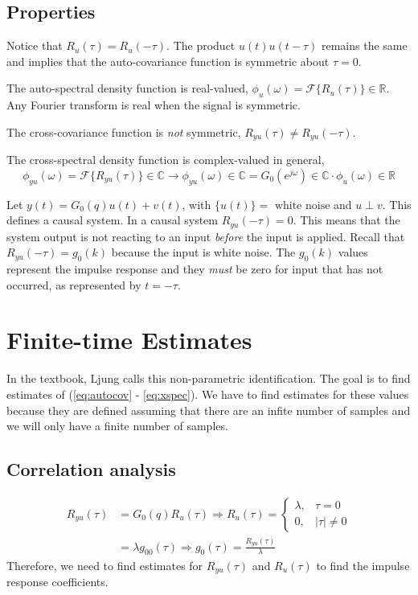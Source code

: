 \documentclass[lecture,12pt,]{pcms-l}
\theoremstyle{example}
\newcommand{\w}{\omega}
\begin{document}
\subsection{Properties}
Notice that $R_u(\tau)=R_u(-\tau)$. The product $u(t)u(t-\tau)$ remains the same and implies that the auto-covariance function is symmetric about $\tau=0$.

The auto-spectral density function is real-valued, $\phi_u(\w) = \mathcal{F}\{R_u(\tau)\}\in\mathbb{R}$. Any Fourier transform is real when the signal is symmetric.

The cross-covariance function is \textit{not} symmetric, $R_{yu}(\tau)\neq R_{yu}(-\tau)$.

The cross-spectral density function is complex-valued in general,
$$\phi_{yu}(\w) = \mathcal{F}\{R_{yu}(\tau)\}\in\mathbb{C} \rightarrow \phi_{yu}(\w)\in\mathbb{C} = G_0(e^{j\w})\in\mathbb{C} \cdot \phi_u(\w)\in\mathbb{R}$$

Let $y(t) = G_0(q)u(t)+v(t)$, with $\{u(t)\}=\text{ white noise}$ and $u\perp v$. This defines a causal system. In a causal system $R_{yu}(-\tau)=0$. This means that the system output is not reacting to an input \textit{before} the input is applied. Recall that $R_{yu}(-\tau)=g_0(k)$ because the input is white noise. The $g_0(k)$ values represent the impulse response and they \textit{must} be zero for input that has not occurred, as represented by $t=-\tau$.

\section{Finite-time Estimates}
In the textbook, Ljung calls this non-parametric identification. The goal is to find estimates of (\ref{eq:autocov} - \ref{eq:xspec}). We have to find estimates for these values because they are defined assuming that there are an infite number of samples and we will only have a finite number of samples.

\subsection{Correlation analysis}
\begin{align*}
R_{yu}(\tau) &= G_0(q)R_u(\tau) \Rightarrow R_u(\tau) = \begin{cases} \lambda, & \tau=0 \\ 0, & |\tau|\neq 0 \end{cases} \\
&= \lambda g_00(\tau) \Rightarrow g_0(\tau) = \frac{R_{yu}(\tau)}{\lambda}
\end{align*}
Therefore, we need to find estimates for $R_{yu}(\tau)$ and $R_u(\tau)$ to find the impulse response coefficients.
\end{document}

